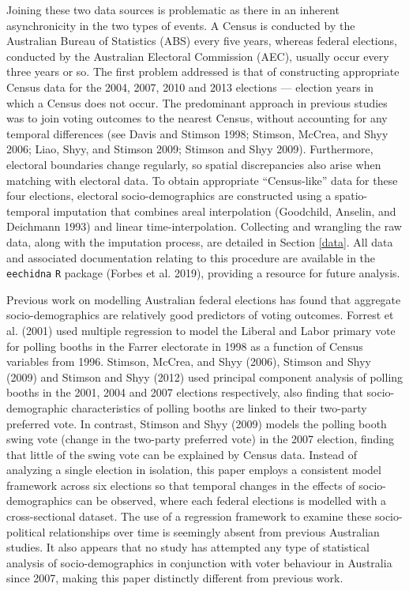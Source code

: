\documentclass[times, doublespace]{anzsauth}
\begin{document}
Joining these two data sources is problematic as there in an inherent asynchronicity in the two types of events. A Census is conducted by the Australian Bureau of Statistics (ABS) every five years, whereas federal elections, conducted by the Australian Electoral Commission (AEC), usually occur every three years or so. The first problem addressed is that of constructing appropriate Census data for the 2004, 2007, 2010 and 2013 elections --- election years in which a Census does not occur. The predominant approach in previous studies was to join voting outcomes to the nearest Census, without accounting for any temporal differences (see Davis and Stimson 1998; Stimson, McCrea, and Shyy 2006; Liao, Shyy, and Stimson 2009; Stimson and Shyy 2009). Furthermore, electoral boundaries change regularly, so spatial discrepancies also arise when matching with electoral data. To obtain appropriate ``Census-like'' data for these four elections, electoral socio-demographics are constructed using a spatio-temporal imputation that combines areal interpolation (Goodchild, Anselin, and Deichmann 1993) and linear time-interpolation. Collecting and wrangling the raw data, along with the imputation process, are detailed in Section \ref{data}. All data and associated documentation relating to this procedure are available in the \texttt{eechidna} \texttt{R} package (Forbes et al. 2019), providing a resource for future analysis.

Previous work on modelling Australian federal elections has found that aggregate socio-demographics are relatively good predictors of voting outcomes. Forrest et al. (2001) used multiple regression to model the Liberal and Labor primary vote for polling booths in the Farrer electorate in 1998 as a function of Census variables from 1996. Stimson, McCrea, and Shyy (2006), Stimson and Shyy (2009) and Stimson and Shyy (2012) used principal component analysis of polling booths in the 2001, 2004 and 2007 elections respectively, also finding that socio-demographic characteristics of polling booths are linked to their two-party preferred vote. In contrast, Stimson and Shyy (2009) models the polling booth swing vote (change in the two-party preferred vote) in the 2007 election, finding that little of the swing vote can be explained by Census data. Instead of analyzing a single election in isolation, this paper employs a consistent model framework across six elections so that temporal changes in the effects of socio-demographics can be observed, where each federal elections is modelled with a cross-sectional dataset. The use of a regression framework to examine these socio-political relationships over time is seemingly absent from previous Australian studies. It also appears that no study has attempted any type of statistical analysis of socio-demographics in conjunction with voter behaviour in Australia since 2007, making this paper distinctly different from previous work.
\end{document}
